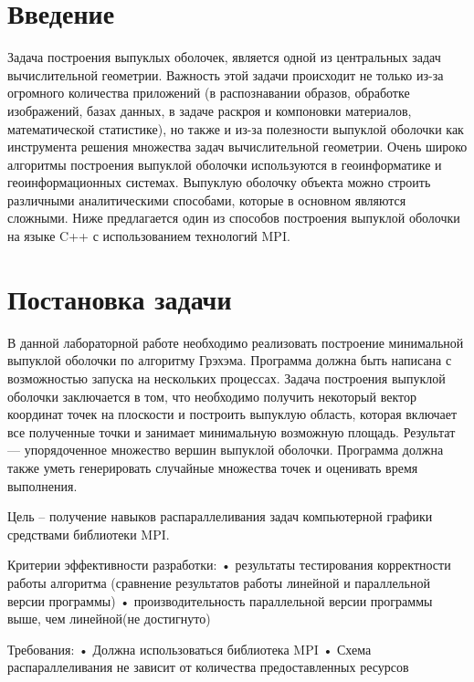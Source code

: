 \documentclass{report}
\begin{document}
\setcounter{page}{2}

\newpage

\section*{Введение}
Задача построения выпуклых оболочек, является одной из центральных задач вычислительной геометрии. Важность этой задачи происходит не только из-за огромного количества приложений (в распознавании образов, обработке изображений, базах данных, в задаче раскроя и компоновки материалов, математической статистике), но также и из-за полезности выпуклой оболочки как инструмента решения множества задач вычислительной геометрии. Очень широко алгоритмы построения выпуклой оболочки используются в геоинформатике и геоинформационных системах. Выпуклую оболочку объекта можно строить различными аналитическими способами, которые в основном являются сложными. Ниже предлагается один из способов построения выпуклой оболочки на языке C++ с использованием технологий MPI.

\newpage

\section*{Постановка задачи}
В данной лабораторной работе необходимо реализовать построение минимальной выпуклой оболочки по алгоритму Грэхэма. Программа должна быть написана с возможностью запуска на нескольких процессах.
Задача построения выпуклой оболочки заключается в том, что необходимо  получить некоторый вектор координат точек на плоскости и построить выпуклую область, которая включает все полученные точки и занимает минимальную возможную площадь.
Результат — упорядоченное множество вершин выпуклой оболочки.
Программа должна также уметь генерировать случайные множества точек и оценивать время выполнения.

\par Цель – получение навыков распараллеливания задач компьютерной графики средствами библиотеки MPI.
\par Критерии эффективности разработки:
•	результаты тестирования корректности работы алгоритма (сравнение результатов работы линейной и параллельной версии программы)
•	производительность параллельной версии программы выше, чем линейной(не достигнуто)
\par Требования:
•	Должна использоваться библиотека MPI
•	Схема распараллеливания не зависит от количества предоставленных ресурсов
\end{document}
